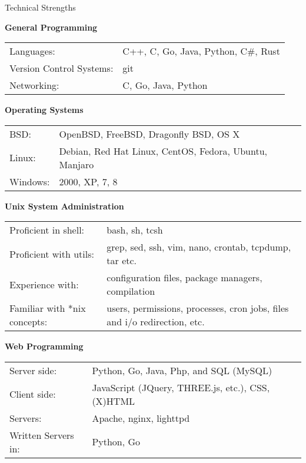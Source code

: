 \documentclass{resume} %
\newcommand{\btab}[2]{
	\bgroup
	\def\arraystretch{#1}
	\begin{tabular}{#2}
}
\newcommand{\etab}{
	\end{tabular} \smallskip
	\egroup
}
\begin{document}
\begin{rSection}{Technical Strengths}

{\bf General Programming}

\btab{1.1}{ l l }
	Languages: & C++, C, Go, Java, Python, C\#, Rust \\
	Version Control Systems: & git \\
	Networking: & C, Go, Java, Python \\
\etab

{\bf Operating Systems}

\btab{1.1}{ l l }
	BSD: & OpenBSD, FreeBSD, Dragonfly BSD, OS X \\
	Linux: & Debian, Red Hat Linux, CentOS, Fedora, Ubuntu, Manjaro \\
	Windows: & 2000, XP, 7, 8
\etab

{\bf Unix System Administration}

\btab{1.1}{ l l }
	Proficient in shell: & bash, sh, tcsh \\
	Proficient with utils: & grep, sed, ssh, vim, nano, crontab, tcpdump, tar etc. \\
	Experience with: & configuration files, package managers, compilation \\
	Familiar with *nix concepts: & users, permissions, processes, cron jobs, files and i/o redirection, etc.
\etab

{\bf Web Programming}

\btab{1.1}{ l l }
	Server side: & Python, Go, Java, Php, and SQL (MySQL) \\
	Client side: & JavaScript (JQuery, THREE.js, etc.), CSS, (X)HTML \\
	Servers: & Apache, nginx, lighttpd \\
	Written Servers in: & Python, Go \\
\etab

\end{rSection}
\end{document}
